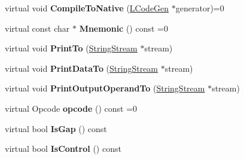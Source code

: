 \begin{DoxyCompactItemize}
\item 
virtual void {\bfseries Compile\+To\+Native} (\hyperlink{classv8_1_1internal_1_1_l_code_gen}{L\+Code\+Gen} $\ast$generator)=0\hypertarget{classv8_1_1internal_1_1_l_instruction_acab3d83fd0de1d783ce5e5e8651009dd}{}\label{classv8_1_1internal_1_1_l_instruction_acab3d83fd0de1d783ce5e5e8651009dd}

\item 
virtual const char $\ast$ {\bfseries Mnemonic} () const  =0\hypertarget{classv8_1_1internal_1_1_l_instruction_ae256d0dcc2d6017d8c49d382254dccee}{}\label{classv8_1_1internal_1_1_l_instruction_ae256d0dcc2d6017d8c49d382254dccee}

\item 
virtual void {\bfseries Print\+To} (\hyperlink{classv8_1_1internal_1_1_string_stream}{String\+Stream} $\ast$stream)\hypertarget{classv8_1_1internal_1_1_l_instruction_a7fd3ca39e41f221d7dd97c947219770c}{}\label{classv8_1_1internal_1_1_l_instruction_a7fd3ca39e41f221d7dd97c947219770c}

\item 
virtual void {\bfseries Print\+Data\+To} (\hyperlink{classv8_1_1internal_1_1_string_stream}{String\+Stream} $\ast$stream)\hypertarget{classv8_1_1internal_1_1_l_instruction_a3e3375f04ff4ab46cd75200cfa1b918d}{}\label{classv8_1_1internal_1_1_l_instruction_a3e3375f04ff4ab46cd75200cfa1b918d}

\item 
virtual void {\bfseries Print\+Output\+Operand\+To} (\hyperlink{classv8_1_1internal_1_1_string_stream}{String\+Stream} $\ast$stream)\hypertarget{classv8_1_1internal_1_1_l_instruction_af5f97137ae7c1b7af3737b41c235f28f}{}\label{classv8_1_1internal_1_1_l_instruction_af5f97137ae7c1b7af3737b41c235f28f}

\item 
virtual Opcode {\bfseries opcode} () const  =0\hypertarget{classv8_1_1internal_1_1_l_instruction_aa0129e8a782b2dd3d9753986e3d245f1}{}\label{classv8_1_1internal_1_1_l_instruction_aa0129e8a782b2dd3d9753986e3d245f1}

\item 
virtual bool {\bfseries Is\+Gap} () const \hypertarget{classv8_1_1internal_1_1_l_instruction_a96115165585397545ac4945072c27dfc}{}\label{classv8_1_1internal_1_1_l_instruction_a96115165585397545ac4945072c27dfc}

\item 
virtual bool {\bfseries Is\+Control} () const \hypertarget{classv8_1_1internal_1_1_l_instruction_a2cc159f22c6519accebaa83d4e554dd7}{}\label{classv8_1_1internal_1_1_l_instruction_a2cc159f22c6519accebaa83d4e554dd7}


\end{DoxyCompactItemize}

